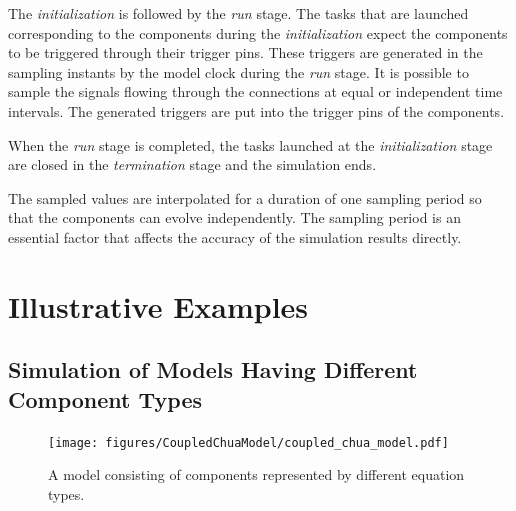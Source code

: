 \documentclass{juliacon}
\begin{document}
The \textit{initialization} is followed by the \textit{run} stage. The tasks that are launched corresponding to the components during the \textit{initialization} expect the components to be triggered through their trigger pins. These triggers are generated in the sampling instants by the model clock during the \textit{run} stage. It is possible to sample the signals flowing through the connections at equal or independent time intervals. The generated triggers are put into the trigger pins of the components.

When the \textit{run} stage is completed, the tasks launched at the \textit{initialization} stage are closed in the \textit{termination} stage and the simulation ends.

The sampled values are interpolated for a duration of one sampling period so that the components can evolve independently. The sampling period is an essential factor that affects the accuracy of the simulation results directly.

\section{Illustrative Examples}

\subsection{Simulation of Models Having Different Component Types}
\begin{figure}
    \centering
    \texttt{[image: figures/CoupledChuaModel/coupled\_chua\_model.pdf]}
    \caption{A model consisting of components represented by different equation types.}
    \label{fig: coupled model}
\end{figure}
\end{document}
